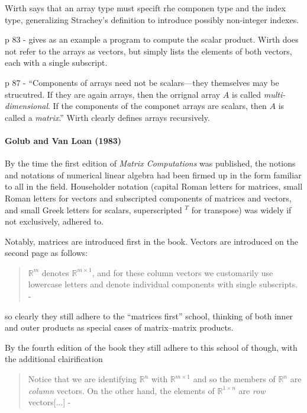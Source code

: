 Wirth says that an array type must specift rhe componen type and the index type,
generalizing Strachey's definition to introduce possibly non-integer indexes.

p 83 - gives as an example a program to compute the scalar product.
Wirth does not refer to the arrays as vectors, but simply lists the elements of
both vectors, each with a single subscript.

p 87 - ``Components of arrays need not be scalars---they themselves may be strucutred.
If they are again arrays, then the orrignal array $A$ is called \textit{multi-dimensional}.
If the components of the componet arrays are scalars, then
$A$ is called a \textit{matrix}.'' Wirth clearly defines arrays recursively.



\paragraph{Golub and Van Loan (1983)~\cite{Golub1983}}

By the time the first edition of \textit{Matrix Computations} was published,
the notions and notations of numerical linear algebra had been firmed up in the
form familiar to all in the field. Householder notation (capital Roman letters
for matrices, small Roman letters for vectors and subscripted components of matrices and vectors,
and small Greek letters for scalars, superscripted $^T$ for transpose) was widely
if not exclusively, adhered to.

Notably, matrices are introduced first in the book.
Vectors are introduced on the second page as follows:
%
\begin{quote}
$\mathbb R^m$ denotes $\mathbb R^{m\times1}$, and for these column vectors we customarily use
lowercase letters and denote individual components with single subscripts.
- \cite[p. 2]{Golub1983}
\end{quote}
%
so clearly they still adhere to the ``matrices first'' school, thinking of both
inner and outer products as special cases of matrix--matrix products.


By the fourth edition of the book they still adhere to this school of though,
with the additional clairification
%
\begin{quote}
Notice that we are identifying $\mathbb R^n$ with $\mathbb R^{m\times1}$ and so the members of $\mathbb R^n$ are
\textit{column} vectors. On the other hand, the elements of $\mathbb R^{1\times n}$ are \textit{row} vectors[...]
- \cite[p. 3]{Golub2013}
\end{quote}
%


